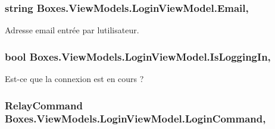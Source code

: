 \subsubsection[{\texorpdfstring{Email}{Email}}]{\setlength{\rightskip}{0pt plus 5cm}string Boxes.\+View\+Models.\+Login\+View\+Model.\+Email\hspace{0.3cm}{\ttfamily [get]}, {\ttfamily [set]}}\hypertarget{class_boxes_1_1_view_models_1_1_login_view_model_adba04d5e03c3760ba5558ede7be4cc7b}{}\label{class_boxes_1_1_view_models_1_1_login_view_model_adba04d5e03c3760ba5558ede7be4cc7b}


Adresse email entrée par l\textquotesingle{}utilisateur. 

\subsubsection[{\texorpdfstring{Is\+Logging\+In}{IsLoggingIn}}]{\setlength{\rightskip}{0pt plus 5cm}bool Boxes.\+View\+Models.\+Login\+View\+Model.\+Is\+Logging\+In\hspace{0.3cm}{\ttfamily [get]}, {\ttfamily [set]}}\hypertarget{class_boxes_1_1_view_models_1_1_login_view_model_a63c41a62b46524d72f7b787df892588c}{}\label{class_boxes_1_1_view_models_1_1_login_view_model_a63c41a62b46524d72f7b787df892588c}


Est-\/ce que la connexion est en cours ? 

\subsubsection[{\texorpdfstring{Login\+Command}{LoginCommand}}]{\setlength{\rightskip}{0pt plus 5cm}Relay\+Command Boxes.\+View\+Models.\+Login\+View\+Model.\+Login\+Command\hspace{0.3cm}{\ttfamily [get]}, {}}\hypertarget{class_boxes_1_1_view_models_1_1_login_view_model_a6f00ee2692c6c1309e8333618495f392}{}\label{class_boxes_1_1_view_models_1_1_login_view_model_a6f00ee2692c6c1309e8333618495f392}


